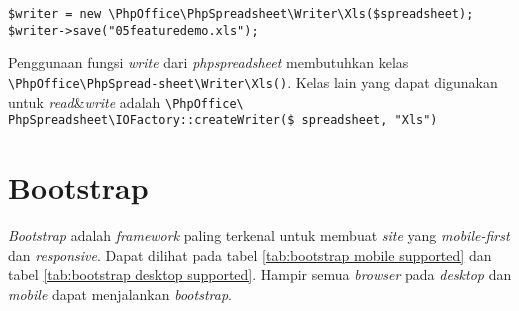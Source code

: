 \begin{lstlisting}
$writer = new \PhpOffice\PhpSpreadsheet\Writer\Xls($spreadsheet);
$writer->save("05featuredemo.xls");
\end{lstlisting}

Penggunaan fungsi \textit{write} dari \textit{phpspreadsheet} membutuhkan kelas \texttt{\textbackslash PhpOffice\textbackslash PhpSpread-\newline sheet\textbackslash Writer\textbackslash Xls()}. Kelas lain yang dapat digunakan untuk \textit{read}\&\textit{write} adalah \texttt{\textbackslash PhpOffice\textbackslash\\ PhpSpreadsheet\textbackslash IOFactory::createWriter(\$ spreadsheet, "Xls")}

\section{Bootstrap}
\textit{Bootstrap} adalah \textit{framework} paling terkenal untuk membuat \textit{site} yang \textit{mobile-first} dan \textit{res\-pon\-sive}\cite{bootstrap}. Dapat dilihat pada tabel \ref{tab:bootstrap mobile supported} dan tabel \ref{tab:bootstrap desktop supported}.  Hampir semua \textit{browser} pada \textit{desktop} dan \textit{mobile} dapat menjalankan \textit{bootstrap}.

\begin{table}[H]
	\centering
	\caption{\textit{Browser Mobile} yang mendukung \textit{bootstrap}}
	\label{tab:bootstrap mobile supported}
\end{table}

